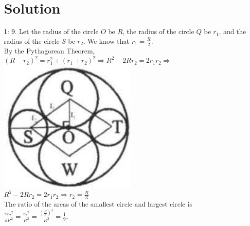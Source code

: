 \documentclass{article}
\begin{document}
\section*{Solution}
1: 9.
Let the radius of the circle \(O\) be \(R\), the radius of the circle \(Q\) be \(r_{1}\), and the radius of the circle \(S\) be \(r_{2}\). We know that \(r_{1}=\frac{R}{2}\).\\
By the Pythagorean Theorem,\\
\(\left(R-r_{2}\right)^{2}=r_{1}^{2}+\left(r_{1}+r_{2}\right)^{2} \Rightarrow R^{2}-2 R r_{2}=2 r_{1} r_{2} \Rightarrow\)\\
\centering
\includegraphics[width=\textwidth]{images/190(1).jpg}\\
\(R^{2}-2 R r_{2}=2 r_{1} r_{2} \Rightarrow r_{2}=\frac{R}{3}\)\\
The ratio of the areas of the smallest circle and largest circle is\\
\(\frac{\pi r_{2}{ }^{2}}{\pi R^{2}}=\frac{r_{2}{ }^{2}}{R^{2}}=\frac{\left(\frac{R}{3}\right)^{2}}{R^{2}}=\frac{1}{9}\).\\
\end{document}

